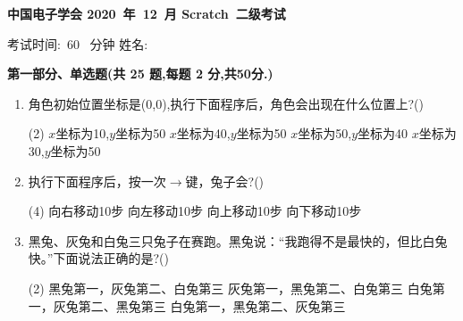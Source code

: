 \documentclass[10pt, a4paper]{article}
\newcommand{\Title}[3]{
    \begin{center}
        \Large \textbf{中国电子学会 #1~年~#2~月 Scratch~#3级考试}
    \end{center}
}
\newcommand{\TimeAndName}[1]{
    \begin{center}
        考试时间:~#1~ 分钟 \qquad\qquad\qquad\qquad 姓名:\underline{\quad\quad\quad\quad}
    \end{center}
}
\begin{document}
    \Title{2020}{12}{二} %
    \TimeAndName{60} %

    \vspace{2mm}
    {\noindent\textbf{第一部分、单选题(共 25 题,每题 2 分,共50分.)}}
    \begin{enumerate}
        \item 角色初始位置坐标是(0,0),执行下面程序后，角色会出现在什么位置上?(\qquad)
        \begin{tasks}(2)
            \task $x$坐标为10,$y$坐标为50
            \task $x$坐标为40,$y$坐标为50
            \task $x$坐标为50,$y$坐标为40
            \task $x$坐标为30,$y$坐标为50
        \end{tasks}

        \item 执行下面程序后，按一次$\to$键，兔子会?(\qquad)
        \begin{tasks}(4)
            \task 向右移动10步
            \task 向左移动10步
            \task 向上移动10步
            \task 向下移动10步
        \end{tasks}

        \item 黑兔、灰兔和白兔三只兔子在赛跑。黑兔说：“我跑得不是最快的，但比白兔快。”下面说法正确的是?(\qquad)
        \begin{tasks}(2)
            \task 黑兔第一，灰兔第二、白兔第三
            \task 灰兔第一，黑兔第二、白兔第三
            \task 白兔第一，灰兔第二、黑兔第三
            \task 白兔第一，黑兔第二、灰兔第三
        \end{tasks}


\end{enumerate}
\end{document}
